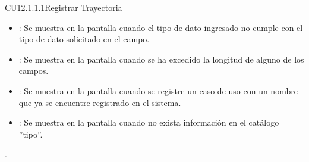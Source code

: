 \begin{UseCase}{CU12.1.1.1}{Registrar Trayectoria}
{\begin{itemize}
		\item {}: Se muestra en la pantalla  cuando el tipo de dato ingresado no cumple con el tipo de dato solicitado en el campo.
		\item {}: Se muestra en la pantalla  cuando se ha excedido la longitud de alguno de los campos.
		\item {}: Se muestra en la pantalla  cuando se registre un caso de uso con un nombre que ya se encuentre registrado en el sistema.
		\item {}: Se muestra en la pantalla  cuando no exista información en el catálogo ''tipo''.
		\end{itemize}.
		}
	\end{UseCase}
